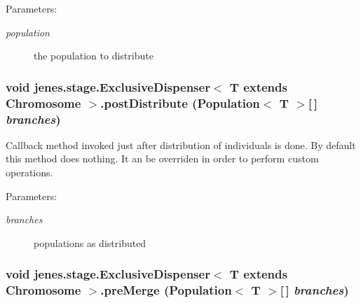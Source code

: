 \begin{Desc}
\item[Parameters:]
\begin{description}
\item[{\em population}]the population to distribute \end{description}
\end{Desc}
\hypertarget{classjenes_1_1stage_1_1_exclusive_dispenser_3_01_t_01extends_01_chromosome_01_4_70031ab873b045876e716d0e702d7846}{
\subsubsection[postDistribute]{\setlength{\rightskip}{0pt plus 5cm}void jenes.stage.ExclusiveDispenser$<$ T extends Chromosome $>$.postDistribute (Population$<$ T $>$\mbox{[}$\,$\mbox{]} {\em branches})}}
\label{classjenes_1_1stage_1_1_exclusive_dispenser_3_01_t_01extends_01_chromosome_01_4_70031ab873b045876e716d0e702d7846}


Callback method invoked just after distribution of individuals is done. By default this method does nothing. It an be overriden in order to perform custom operations.

\begin{Desc}
\item[Parameters:]
\begin{description}
\item[{\em branches}]populations as distributed \end{description}
\end{Desc}
\hypertarget{classjenes_1_1stage_1_1_exclusive_dispenser_3_01_t_01extends_01_chromosome_01_4_e93239ca47669daaeea41d2f8ab6fe51}{
\subsubsection[preMerge]{\setlength{\rightskip}{0pt plus 5cm}void jenes.stage.ExclusiveDispenser$<$ T extends Chromosome $>$.preMerge (Population$<$ T $>$\mbox{[}$\,$\mbox{]} {\em branches})}}
\label{classjenes_1_1stage_1_1_exclusive_dispenser_3_01_t_01extends_01_chromosome_01_4_e93239ca47669daaeea41d2f8ab6fe51}


